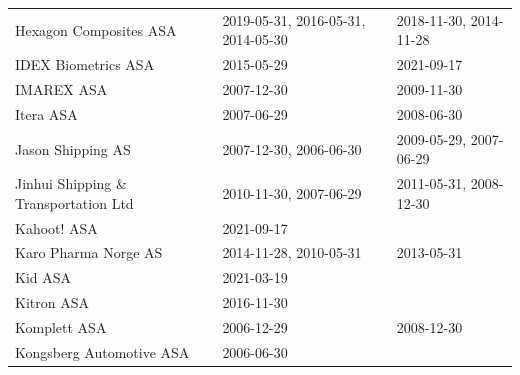 \begin{table}[H]
\begin{tabularx}{\textwidth}{XXX}
Hexagon Composites ASA & 2019-05-31, 2016-05-31, 2014-05-30 & 2018-11-30, 2014-11-28 \\ 
IDEX Biometrics ASA & 2015-05-29 & 2021-09-17 \\ 
IMAREX ASA & 2007-12-30 & 2009-11-30 \\ 
Itera ASA & 2007-06-29 & 2008-06-30 \\ 
Jason Shipping AS & 2007-12-30, 2006-06-30 & 2009-05-29, 2007-06-29 \\ 
Jinhui Shipping \& Transportation Ltd & 2010-11-30, 2007-06-29 & 2011-05-31, 2008-12-30 \\ 
Kahoot! ASA & 2021-09-17 &  \\ 
Karo Pharma Norge AS & 2014-11-28, 2010-05-31 & 2013-05-31 \\ 
Kid ASA & 2021-03-19 &  \\ 
Kitron ASA & 2016-11-30 &  \\ 
Komplett ASA & 2006-12-29 & 2008-12-30 \\ 
Kongsberg Automotive ASA & 2006-06-30 &  \\ 
\bottomrule
\end{tabularx}
\end{table}
\newpage
\clearpage

